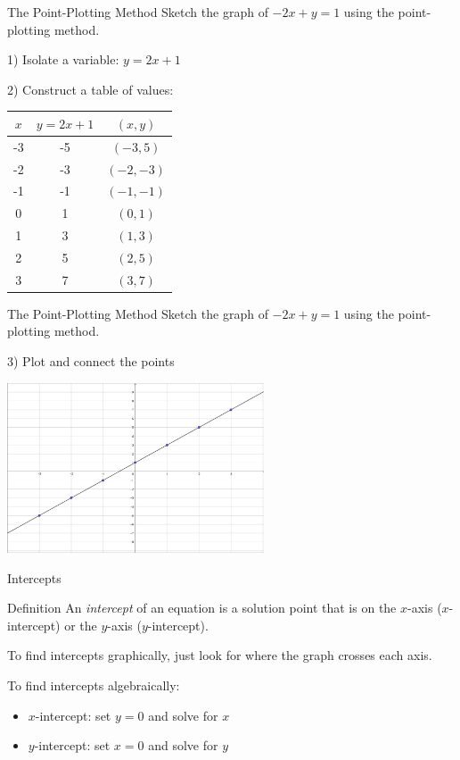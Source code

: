 \documentclass{beamer}
\begin{document}
\begin{frame}[t]{The Point-Plotting Method}
Sketch the graph of $-2x + y = 1$ using the point-plotting method.

\pause

1) Isolate a variable: $y = 2x + 1$

\pause

2) Construct a table of values:
\begin{tabular}{|c|c|c|}
\hline 
$x$ & $y = 2x + 1$ & $(x,y)$ \\ 
\hline 
-3 & -5 & $(-3, 5)$ \\ 
\hline 
-2 & -3 & $(-2, -3)$ \\ 
\hline 
-1 & -1 & $(-1,-1)$ \\ 
\hline 
0 & 1 & $(0,1)$ \\ 
\hline 
1 & 3 & $(1,3)$ \\ 
\hline 
2 & 5 & $(2,5)$ \\ 
\hline 
3 & 7 & $(3,7)$ \\ 
\hline 
\end{tabular} 
\end{frame}

\begin{frame}[t]{The Point-Plotting Method}
Sketch the graph of $-2x + y = 1$ using the point-plotting method.

3) Plot and connect the points

\includegraphics[width=3in]{GraphLine1.png}
\end{frame}

\begin{frame}[t]{Intercepts}
\begin{block}{Definition}
An \textit{intercept} of an equation is a solution point that is on the $x$-axis ($x$-intercept) or the $y$-axis ($y$-intercept).
\end{block}

\pause

To find intercepts graphically, just look for where the graph crosses each axis.

\pause

To find intercepts algebraically: \vspace{-6pt} \begin{itemize}
\item $x$-intercept: set $y = 0$ and solve for $x$
\item $y$-intercept: set $x = 0$ and solve for $y$
\end{itemize}
\end{frame}
\end{document}
